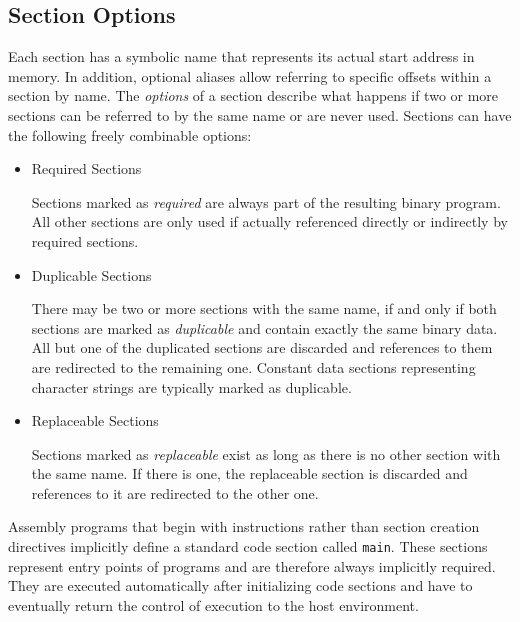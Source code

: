 \subsection{Section Options}\label{sec:asmsectionoptions}

Each section has a symbolic name that represents its actual start address in memory.
In addition, optional aliases allow referring to specific offsets within a section by name.
The \emph{options} of a section describe what happens if two or more sections can be referred to by the same name or are never used.
Sections can have the following freely combinable options:

\begin{itemize}

\item Required Sections\nopagebreak

Sections marked as \emph{required} are always part of the resulting binary program.
All other sections are only used if actually referenced directly or indirectly by required sections.

\item Duplicable Sections\nopagebreak

There may be two or more sections with the same name, if and only if both sections are marked as \emph{duplicable} and contain exactly the same binary data.
All but one of the duplicated sections are discarded and references to them are redirected to the remaining one.
Constant data sections representing character strings are typically marked as duplicable.

\item Replaceable Sections\nopagebreak

Sections marked as \emph{replaceable} exist as long as there is no other section with the same name.
If there is one, the replaceable section is discarded and references to it are redirected to the other one.

\end{itemize}

Assembly programs that begin with instructions rather than section creation directives implicitly define a standard code section called \texttt{main}.
These sections represent entry points of programs and are therefore always implicitly required.
They are executed automatically after initializing code sections and have to eventually return the control of execution to the host environment.

